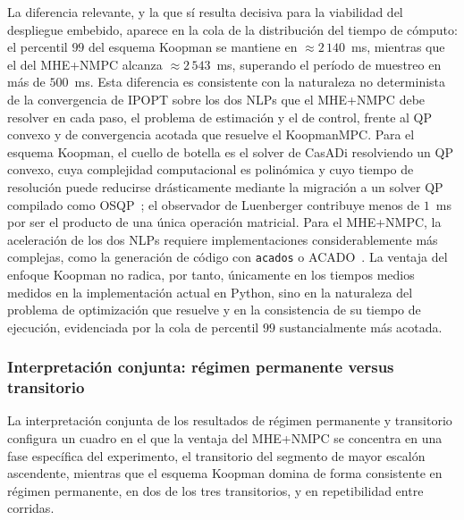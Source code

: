 \documentclass[12pt,letterpaper]{article}
\begin{document}
La diferencia relevante, y la que sí resulta decisiva para la 
viabilidad del despliegue embebido, aparece en la cola de la 
distribución del tiempo de cómputo: el percentil $99$ del esquema 
Koopman se mantiene en $\approx 2\,140$~ms, mientras que el del 
MHE+NMPC alcanza $\approx 2\,543$~ms, superando el período de 
muestreo en más de $500$~ms. Esta diferencia es consistente con la 
naturaleza no determinista de la convergencia de IPOPT sobre los 
dos NLPs que el MHE+NMPC debe resolver en cada paso, el problema
de estimación y el de control, frente al QP convexo y de
convergencia acotada que resuelve el KoopmanMPC. Para el esquema 
Koopman, el cuello de botella es el solver de CasADi resolviendo 
un QP convexo, cuya complejidad computacional es polinómica y cuyo 
tiempo de resolución puede reducirse drásticamente mediante la 
migración a un solver QP compilado como OSQP~\cite{stellato2020}; 
el observador de Luenberger contribuye menos de $1$~ms por ser el 
producto de una única operación matricial. Para el MHE+NMPC, la 
aceleración de los dos NLPs requiere implementaciones 
considerablemente más complejas, como la generación de código con 
\texttt{acados} o ACADO~\cite{houska2011}. La ventaja del enfoque 
Koopman no radica, por tanto, únicamente en los tiempos medios 
medidos en la implementación actual en Python, sino en la 
naturaleza del problema de optimización que resuelve y en la 
consistencia de su tiempo de ejecución, evidenciada por la cola 
de percentil $99$ sustancialmente más acotada.

\subsubsection{Interpretación conjunta: régimen permanente versus transitorio}
\label{sec:analisis_exp_interp}

La interpretación conjunta de los resultados de régimen permanente 
y transitorio configura un cuadro en el que la ventaja del 
MHE+NMPC se concentra en una fase específica del experimento, el
transitorio del segmento de mayor escalón ascendente, mientras
que el esquema Koopman domina de forma consistente en régimen 
permanente, en dos de los tres transitorios, y en repetibilidad 
entre corridas.
\end{document}
